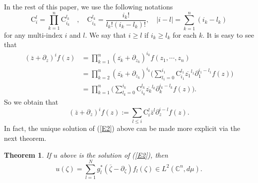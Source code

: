 \documentclass[11pt,reqno]{amsart}
\newtheorem{theorem}{Theorem}
\theoremstyle{definition}
\begin{document}
In the rest of this paper, we use the following notations  $$\mathrm{C}_{i}^{l}=\prod_{k=1}^n\mathrm{C}_{i_k}^{l_k}\quad, \quad \mathrm{C}_{i_k}^{l_k}=\frac{i_k!}{l_k!(i_k-l_k)!},\quad |i-l|=\sum_{k=1}^n (i_k-l_k)$$
for any multi-index $i$ and $l$. We say that $i\geq l$ if $i_k\geq l_k$ for each $k$. It is easy to see that
 \begin{align*}
(\overline{z}+\partial_z)^if(z)&=\prod_{k=1}^n (\overline{z_k}+\partial_{z_k})^{i_k}f(z_1,\cdots,z_n)\nonumber\\
&=\prod_{k=2}^n (\overline{z_k}+\partial_{z_k})^{i_k}\bigg(\sum_{l_1=0}^{i_1}\mathrm{C}_{i_1}^{l_1} \overline{z_1}^{l_1}\partial_{1}^{i_1-l_1} f(z) \bigg)\nonumber\\
&=\prod_{k=1}^n  \bigg(\sum_{l_k=0}^{i_k}\mathrm{C}_{i_k}^{l_k} \overline{z_k}^{l_k}\partial_{k}^{i_k-l_k} f(z) \bigg).
\end{align*}
So we obtain that
\begin{equation}\label{E8}
(\overline{z}+\partial_z)^if(z):=\sum_{l\leq i} \mathrm{C}_{i}^{l}\overline{ z}^l \partial_{z}^{i-l}f(z).
\end{equation}
In fact, the unique solution of (\ref{E2}) above can be made more explicit via the next theorem.
\begin{theorem}\label{l2}
If $u$ above is the solution of (\ref{E2}), then
$$u(\zeta)=\sum_{l=1}^Ng_l^*(\overline{\zeta}-\partial_\zeta)f_l(\zeta)\in L^2(\mathbb{C}^n,d\mu).$$
\end{theorem}
\end{document}
